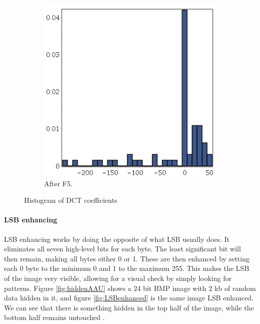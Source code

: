 \begin{figure}
\begin{subfigure}[b]{0.45\textwidth}
		\includegraphics[width=\textwidth]{figures/outputF5.png}
		\caption{After F5.}
		\label{fig:outputF5}
    \end{subfigure}
    \caption{Histogram of DCT coefficients}\label{fig:animals}
\end{figure}


\paragraph*{LSB enhancing}
LSB enhancing works by doing the opposite of what LSB usually does.
It eliminates all seven high-level bits for each byte. 
The least significant bit will then remain, making all bytes either 0 or 1.
These are then enhanced by setting each 0 byte to the minimum 0 and 1 to the maximum 255.
This makes the LSB of the image very visible, allowing for a visual check by simply looking for patterns.
Figure \ref{fig:hiddenAAU} shows a 24 bit BMP image with 2 kb of random data hidden in it, and figure \ref{fig:LSBenhanced} is the same image LSB enhanced.
We can see that there is something hidden in the top half of the image, while the bottom half remains untouched \citep{Westfeld2000}.

